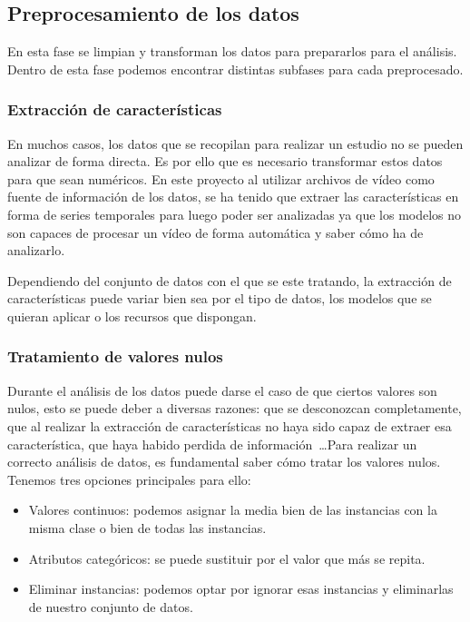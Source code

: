 \subsection{Preprocesamiento de los datos}
En esta fase se limpian y transforman los datos para prepararlos para el análisis. Dentro de esta fase podemos encontrar distintas subfases para cada preprocesado.

\subsubsection{Extracción de características}
En muchos casos, los datos que se recopilan para realizar un estudio no se pueden analizar de forma directa. Es por ello que es necesario transformar estos datos para que sean numéricos. En este proyecto al utilizar archivos de vídeo como fuente de información de los datos, se ha tenido que extraer las características en forma de series temporales para luego poder ser analizadas ya que los modelos no son capaces de procesar un vídeo de forma automática y saber cómo ha de analizarlo.

Dependiendo del conjunto de datos con el que se este tratando, la extracción de características puede variar bien sea por el tipo de datos, los modelos que se quieran aplicar o los recursos que dispongan.

\subsubsection{Tratamiento de valores nulos}
Durante el análisis de los datos puede darse el caso de que ciertos valores son nulos, esto se puede deber a diversas razones: que se desconozcan completamente, que al realizar la extracción de características no haya sido capaz de extraer esa característica, que haya habido perdida de información~\ldots Para realizar un correcto análisis de datos, es fundamental saber cómo tratar los valores nulos. Tenemos tres opciones principales para ello:
\begin{itemize}
\item Valores continuos: podemos asignar la media bien de las instancias con la misma clase o bien de todas las instancias.
\item Atributos categóricos: se puede sustituir por el valor que más se repita.
\item Eliminar instancias: podemos optar por ignorar esas instancias y eliminarlas de nuestro conjunto de datos.
\end{itemize} 

